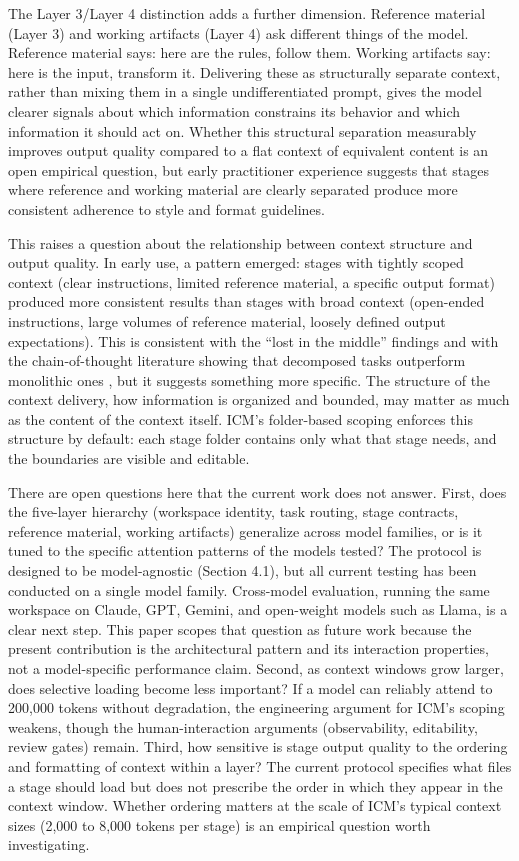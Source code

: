 \documentclass[acmlarge,nonacm,screen]{acmart}
\begin{document}
The Layer 3/Layer 4 distinction adds a further dimension. Reference material (Layer 3) and working artifacts (Layer 4) ask different things of the model. Reference material says: here are the rules, follow them. Working artifacts say: here is the input, transform it. Delivering these as structurally separate context, rather than mixing them in a single undifferentiated prompt, gives the model clearer signals about which information constrains its behavior and which information it should act on. Whether this structural separation measurably improves output quality compared to a flat context of equivalent content is an open empirical question, but early practitioner experience suggests that stages where reference and working material are clearly separated produce more consistent adherence to style and format guidelines.

This raises a question about the relationship between context structure and output quality. In early use, a pattern emerged: stages with tightly scoped context (clear instructions, limited reference material, a specific output format) produced more consistent results than stages with broad context (open-ended instructions, large volumes of reference material, loosely defined output expectations). This is consistent with the ``lost in the middle'' findings \cite{liu2024} and with the chain-of-thought literature showing that decomposed tasks outperform monolithic ones \cite{wei2022}, but it suggests something more specific. The structure of the context delivery, how information is organized and bounded, may matter as much as the content of the context itself. ICM's folder-based scoping enforces this structure by default: each stage folder contains only what that stage needs, and the boundaries are visible and editable.

There are open questions here that the current work does not answer. First, does the five-layer hierarchy (workspace identity, task routing, stage contracts, reference material, working artifacts) generalize across model families, or is it tuned to the specific attention patterns of the models tested? The protocol is designed to be model-agnostic (Section 4.1), but all current testing has been conducted on a single model family. Cross-model evaluation, running the same workspace on Claude, GPT, Gemini, and open-weight models such as Llama, is a clear next step. This paper scopes that question as future work because the present contribution is the architectural pattern and its interaction properties, not a model-specific performance claim. Second, as context windows grow larger, does selective loading become less important? If a model can reliably attend to 200,000 tokens without degradation, the engineering argument for ICM's scoping weakens, though the human-interaction arguments (observability, editability, review gates) remain. Third, how sensitive is stage output quality to the ordering and formatting of context within a layer? The current protocol specifies what files a stage should load but does not prescribe the order in which they appear in the context window. Whether ordering matters at the scale of ICM's typical context sizes (2,000 to 8,000 tokens per stage) is an empirical question worth investigating.
\end{document}
